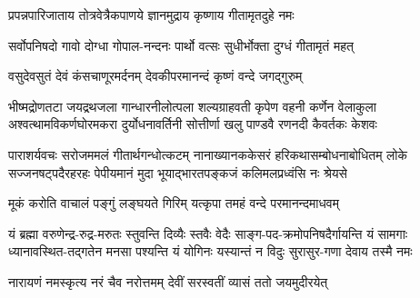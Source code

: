 \twolineshloka
{प्रपन्नपारिजाताय तोत्रवेत्रैकपाणये}
{ज्ञानमुद्राय कृष्णाय गीतामृतदुहे नमः}%

\twolineshloka
{सर्वोपनिषदो गावो दोग्धा गोपाल-नन्दनः}
{पार्थो वत्सः सुधीर्भोक्ता दुग्धं गीतामृतं महत्}%

\twolineshloka
{वसुदेवसुतं देवं कंसचाणूरमर्दनम्}
{देवकीपरमानन्दं कृष्णं वन्दे जगद्गुरुम्}%

\fourlineindentedshloka
{भीष्मद्रोणतटा जयद्रथजला गान्धारनीलोत्पला}
{शल्यग्राहवती कृपेण वहनी कर्णेन वेलाकुला}
{अश्वत्थामविकर्णघोरमकरा दुर्योधनावर्तिनी}
{सोत्तीर्णा खलु पाण्डवै रणनदी कैवर्तकः केशवः}%

\fourlineindentedshloka
{पाराशर्यवचः सरोजममलं गीतार्थगन्धोत्कटम्}
{नानाख्यानककेसरं हरिकथासम्बोधनाबोधितम्}
{लोके सज्जनषट्‌पदैरहरहः पेपीयमानं मुदा}
{भूयाद्भारतपङ्कजं कलिमलप्रध्वंसि नः श्रेयसे}%

\twolineshloka
{मूकं करोति वाचालं पङ्गुं लङ्घयते गिरिम्}
{यत्कृपा तमहं वन्दे परमानन्दमाधवम्}%

\fourlineindentedshloka
{यं ब्रह्मा वरुणेन्द्र-रुद्र-मरुतः स्तुवन्ति दिव्यैः स्तवैः}
{वेदैः साङ्ग-पद-क्रमोपनिषदैर्गायन्ति यं सामगाः}
{ध्यानावस्थित-तद्गतेन मनसा पश्यन्ति यं योगिनः}
{यस्यान्तं न विदुः सुरासुर-गणा देवाय तस्मै नमः}%

\twolineshloka
{नारायणं नमस्कृत्य नरं चैव नरोत्तमम्}
{देवीं सरस्वतीं व्यासं ततो जयमुदीरयेत्}%

\resetShloka